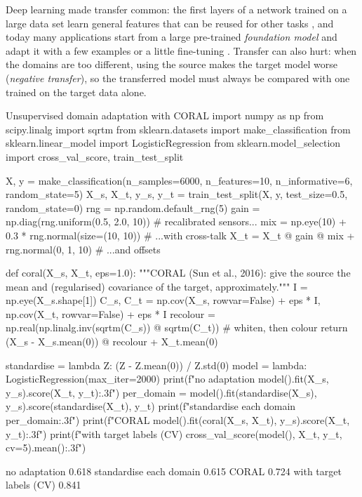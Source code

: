 Deep learning made transfer common: the first layers of a network trained on a large data set learn general
features that can be reused for other tasks \citep{yosinski2014transferable}, and today many applications start from a
large pre-trained \emph{foundation model} and adapt it with a few examples or a little fine-tuning
\citep{bommasani2021opportunities}. Transfer can also hurt: when the domains are too different, using the source makes the
target model worse (\emph{negative transfer}), so the transferred model must always be compared with one trained on the
target data alone.

\begin{pylisting}[label={lst:coral}]{Unsupervised domain adaptation with CORAL}
import numpy as np
from scipy.linalg import sqrtm
from sklearn.datasets import make_classification
from sklearn.linear_model import LogisticRegression
from sklearn.model_selection import cross_val_score, train_test_split

X, y = make_classification(n_samples=6000, n_features=10, n_informative=6, random_state=5)
X_s, X_t, y_s, y_t = train_test_split(X, y, test_size=0.5, random_state=0)
rng = np.random.default_rng(5)
gain = np.diag(rng.uniform(0.5, 2.0, 10))                  # recalibrated sensors...
mix = np.eye(10) + 0.3 * rng.normal(size=(10, 10))              # ...with cross-talk
X_t = X_t @ gain @ mix + rng.normal(0, 1, 10)                    # ...and offsets

def coral(X_s, X_t, eps=1.0):
    """CORAL (Sun et al., 2016): give the source the mean and (regularised) covariance of
    the target, approximately."""
    I = np.eye(X_s.shape[1])
    C_s, C_t = np.cov(X_s, rowvar=False) + eps * I, np.cov(X_t, rowvar=False) + eps * I
    recolour = np.real(np.linalg.inv(sqrtm(C_s)) @ sqrtm(C_t))   # whiten, then colour
    return (X_s - X_s.mean(0)) @ recolour + X_t.mean(0)

standardise = lambda Z: (Z - Z.mean(0)) / Z.std(0)
model = lambda: LogisticRegression(max_iter=2000)
print(f"no adaptation             {model().fit(X_s, y_s).score(X_t, y_t):.3f}")
per_domain = model().fit(standardise(X_s), y_s).score(standardise(X_t), y_t)
print(f"standardise each domain   {per_domain:.3f}")
print(f"CORAL                     {model().fit(coral(X_s, X_t), y_s).score(X_t, y_t):.3f}")
print(f"with target labels (CV)   {cross_val_score(model(), X_t, y_t, cv=5).mean():.3f}")
\end{pylisting}
\begin{pyoutput}
no adaptation             0.618
standardise each domain   0.615
CORAL                     0.724
with target labels (CV)   0.841
\end{pyoutput}


